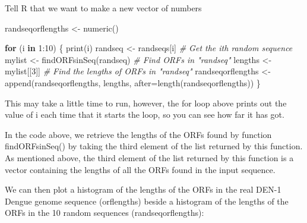 \documentclass[
]{book}
\newenvironment{Shaded}{\begin{snugshade}}{\end{snugshade}}
\newcommand{\AttributeTok}[1]{\textcolor[rgb]{0.77,0.63,0.00}{#1}}
\newcommand{\CommentTok}[1]{\textcolor[rgb]{0.56,0.35,0.01}{\textit{#1}}}
\newcommand{\ControlFlowTok}[1]{\textcolor[rgb]{0.13,0.29,0.53}{\textbf{#1}}}
\newcommand{\DecValTok}[1]{\textcolor[rgb]{0.00,0.00,0.81}{#1}}
\newcommand{\FunctionTok}[1]{\textcolor[rgb]{0.00,0.00,0.00}{#1}}
\newcommand{\NormalTok}[1]{#1}
\newcommand{\OtherTok}[1]{\textcolor[rgb]{0.56,0.35,0.01}{#1}}
\newcommand{\SpecialCharTok}[1]{\textcolor[rgb]{0.00,0.00,0.00}{#1}}
\begin{document}
Tell R that we want to make a new vector of numbers

\begin{Shaded}
\begin{Highlighting}[]
\NormalTok{randseqorflengths }\OtherTok{\textless{}{-}} \FunctionTok{numeric}\NormalTok{()            }
\end{Highlighting}
\end{Shaded}

\begin{Shaded}
\begin{Highlighting}[]
\ControlFlowTok{for}\NormalTok{ (i }\ControlFlowTok{in} \DecValTok{1}\SpecialCharTok{:}\DecValTok{10}\NormalTok{)}
\NormalTok{  \{}
     \FunctionTok{print}\NormalTok{(i)}
\NormalTok{     randseq }\OtherTok{\textless{}{-}}\NormalTok{ randseqs[i]                     }\CommentTok{\# Get the ith random sequence}
\NormalTok{     mylist }\OtherTok{\textless{}{-}} \FunctionTok{findORFsinSeq}\NormalTok{(randseq)           }\CommentTok{\# Find ORFs in "randseq"}
\NormalTok{     lengths }\OtherTok{\textless{}{-}}\NormalTok{ mylist[[}\DecValTok{3}\NormalTok{]]                     }\CommentTok{\# Find the lengths of ORFs in "randseq"}
\NormalTok{     randseqorflengths }\OtherTok{\textless{}{-}} \FunctionTok{append}\NormalTok{(randseqorflengths, lengths, }\AttributeTok{after=}\FunctionTok{length}\NormalTok{(randseqorflengths))}
\NormalTok{  \}}
\end{Highlighting}
\end{Shaded}

This may take a little time to run, however, the for loop above prints out the value of i each time that it starts the loop, so you can see how far it has got.

In the code above, we retrieve the lengths of the ORFs found by function findORFsinSeq() by taking the third element of the list returned by this function. As mentioned above, the third element of the list returned by this function is a vector containing the lengths of all the ORFs found in the input sequence.

We can then plot a histogram of the lengths of the ORFs in the real DEN-1 Dengue genome sequence (orflengths) beside a histogram of the lengths of the ORFs in the 10 random sequences (randseqorflengths):
\end{document}
